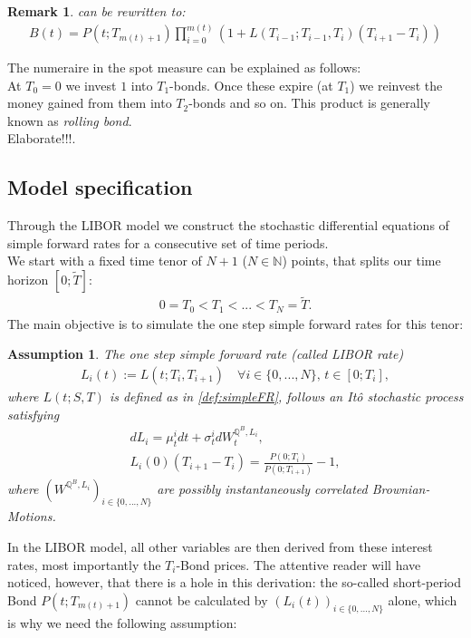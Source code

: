 \documentclass[12pt]{article}
\newtheorem{assumption}{Assumption}[section]
\newtheorem{remark}[theorem]{Remark}
\begin{document}
	\begin{remark}
		 can be rewritten to:
		\begin{align}\label{eq:spotNumeraireAlt}
			B(t) = P(t;T_{m(t)+1})\prod_{i=0}^{m(t)}(1 + L(T_{i-1};T_{i-1},T_i)(T_{i+1}-T_i))
		\end{align}
	\end{remark}
	The numeraire in the spot measure can be explained as follows:\\
	At $T_0 = 0$ we invest $1$ into $T_1$-bonds. Once these expire (at $T_1$) we reinvest the money gained from them into $T_2$-bonds and so on.
	This product is generally known as \emph{rolling bond}.\\
	\color{red}Elaborate!!!\color{black}. 
	
	\subsection{Model specification}\label{sec:libModel}
	Through the LIBOR model we construct the stochastic differential equations of simple forward rates for a consecutive set of time periods.\\
	We start with a fixed time tenor of $N+1$ ($N \in \mathbb{N}$) points, that splits our time horizon $[0;\tilde{T}]$:
	\begin{align*}
		0 = T_0 < T_1 < ... < T_N = \tilde{T}.
	\end{align*}
	The main objective is to simulate the one step simple forward rates for this tenor:
	\begin{assumption}\label{as:LIBORisItoProcess}
		The one step simple forward rate (called LIBOR rate)
		\begin{align*}
			L_i(t) := L(t;T_i, T_{i+1}) \quad \forall i \in \{0, ..., N\}\text{, } t\in[0;T_i],
		\end{align*}
		where $L(t;S, T)$ is defined as in \cref{def:simpleFR},
		follows an Itô stochastic process satisfying
		\begin{align*}
			dL_i = \mu^i_t dt + \sigma^i_t dW^{\mathbb{Q}^B, L_i}_t,\\
			L_i(0)(T_{i+1} - T_i) = \frac{P(0;T_i)}{P(0;T_{i+1})} - 1,
		\end{align*}
		where $(W^{\mathbb{Q}^B, L_i})_{i\in \{0, ..., N\}}$ are possibly instantaneously correlated Brownian-Motions.
	\end{assumption}
	In the LIBOR model, all other variables are then derived from these interest rates, most importantly the $T_i$-Bond prices. The attentive reader will have noticed, however, that there is a hole in this derivation: the so-called short-period Bond $P(t;T_{m(t)+1})$ cannot be calculated by $(L_i(t))_{i\in\{0, ..., N\}}$ alone, which is why we need the following assumption:
\end{document}
